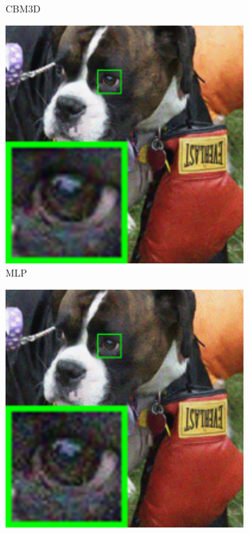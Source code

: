 \begin{figure}
\begin{subfigure}[t]{0.19\textwidth}
		\caption{CBM3D}
    \end{subfigure}
    \hfill
    \begin{subfigure}[t]{0.19\textwidth}
        \centering
        \includegraphics[width=1\textwidth]{images/mcwnnm/nc/resize_br_MLP_dog.png}
\caption{MLP}
    \end{subfigure}
    \hfill
    \begin{subfigure}[t]{0.19\textwidth}
        \centering
        \includegraphics[width=1\textwidth]{images/mcwnnm/nc/resize_br_TNRD_dog.png}

\end{subfigure}
\end{figure}
